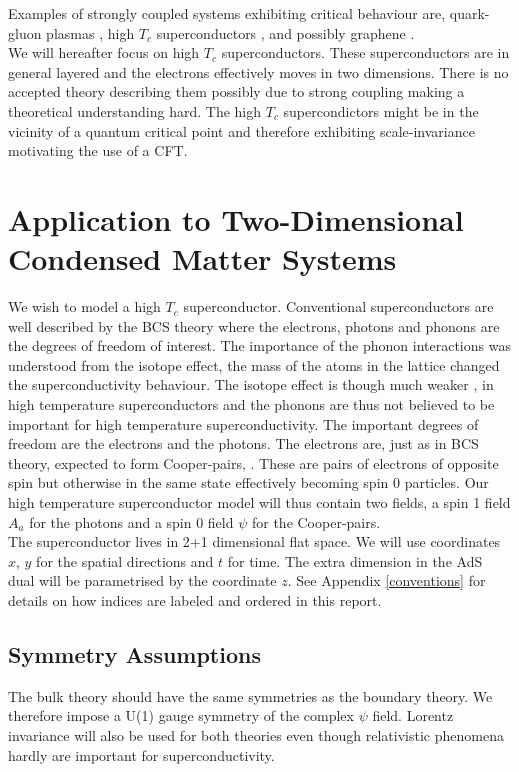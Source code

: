 \documentclass[12pt]{report}
\begin{document}
Examples of strongly coupled systems exhibiting critical behaviour are, quark-gluon plasmas \cite{PhysRevD.73.045013}, high $T_c$ superconductors \cite{hartnoll8}, and possibly graphene \cite{hartnoll8}.\\

We will hereafter focus on high $T_c$ superconductors. These superconductors are in general layered and the electrons effectively moves in two dimensions. There is no accepted theory describing them possibly due to strong coupling making a theoretical understanding hard. The high $T_c$ supercondictors might be in the vicinity of a quantum critical point \cite{dome} and therefore exhibiting scale-invariance motivating the use of a CFT.

\chapter{Application to Two-Dimensional Condensed Matter Systems}
We wish to model a high $T_c$ superconductor. Conventional superconductors are well described by the BCS theory where the electrons, photons and phonons are the degrees of freedom of interest. The importance of the phonon interactions was understood from the isotope effect, the mass of the atoms in the lattice changed the superconductivity behaviour. The isotope effect is though much weaker \cite{leggett2006we}, in high temperature superconductors and the phonons are thus not believed to be important for high temperature superconductivity. The important degrees of freedom are the electrons and the photons. The electrons are, just as in BCS theory, expected to form Cooper-pairs, \cite{leggett2006we}. These are pairs of electrons of opposite spin but otherwise in the same state effectively becoming spin 0 particles. Our high temperature superconductor model will thus contain two fields, a spin 1 field $A_a$ for the photons and a spin 0 field $\psi$ for the Cooper-pairs.\\

The superconductor lives in 2+1 dimensional flat space. We will use coordinates $x$, $y$ for the spatial directions and $t$ for time. The extra dimension in the AdS dual will be parametrised by the coordinate $z$. See Appendix \ref{conventions} for details on how indices are labeled and ordered in this report. 
\section{Symmetry Assumptions}
The bulk theory should have the same symmetries as the boundary theory. We therefore impose a U(1) gauge symmetry of the complex $\psi$ field. Lorentz invariance will also be used for both theories even though relativistic phenomena hardly are important for superconductivity.
\end{document}
